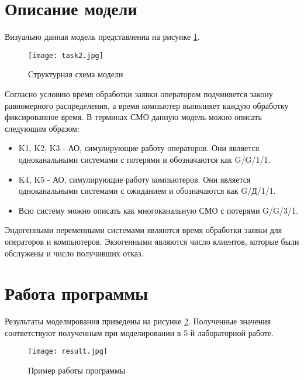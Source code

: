\section{Описание модели}
	Визуально данная модель представленна на рисунке \ref{pic:scheme}.
	
	\begin{figure}[h]
		\begin{center}
			{\texttt{[image: task2.jpg]}
				\caption{Структурная схема модели}
				\label{pic:scheme}}
		\end{center}
	\end{figure}

	Согласно условию время обработки заявки оператором подчиняется закону равномерного распределения, а время компьютер выполняет каждую обработку фиксированное время. В терминах СМО данную модель можно описать следующим образом:
	\begin{itemize}
		\item K1, K2, K3 - АО, симулирующие работу операторов. Они является одноканальными системами с потерями и обозначаются как G/G/1/1.
		\item K4, K5 - АО, симулирующие работу компьютеров. Они является одноканальными системами с ожиданием и обозначаются как G/Д/1/1.
		\item Всю систему можно описать как многоканальную СМО с потерями G/G/3/1.
	\end{itemize}

	Эндогенными переменными системами являются время обработки заявки для операторов и компьютеров. Экзогенными являются число клиентов, которые были обслужены и число получивших отказ.

	
\section{Работа программы}	
	Результаты моделирования приведены на рисунке \ref{pic:res}. Полученные значения соответствуют полученным при моделировании в 5-й лабораторной работе.
	
	\begin{figure}[h]
		\begin{center}
			{\texttt{[image: result.jpg]}
				\caption{Пример работы программы}
				\label{pic:res}}
		\end{center}
	\end{figure}
	